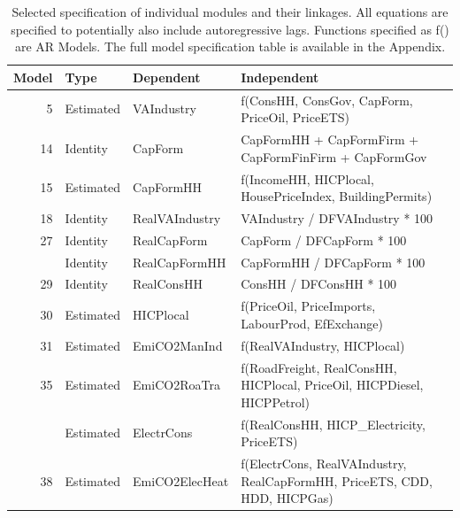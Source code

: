 \begin{table}
\centering\centering
\caption{\label{tab:spec_subset}Selected specification of individual modules and their linkages. All equations are specified to potentially also include autoregressive lags. Functions specified as f() are AR Models. The full model specification table is available in the Appendix.}
\centering
\fontsize{8}{10}\selectfont
\begin{tabular}[t]{rll>{\raggedright\arraybackslash}p{10cm}}
\toprule
Model & Type & Dependent & Independent\\
\midrule
5 & Estimated & VAIndustry & f(ConsHH, ConsGov, CapForm, PriceOil, PriceETS)\\
14 & Identity & CapForm & CapFormHH + CapFormFirm + CapFormFinFirm + CapFormGov\\
15 & Estimated & CapFormHH & f(IncomeHH, HICPlocal, HousePriceIndex, BuildingPermits)\\
18 & Identity & RealVAIndustry & VAIndustry / DFVAIndustry * 100\\
27 & Identity & RealCapForm & CapForm / DFCapForm * 100\\
\addlinespace
28 & Identity & RealCapFormHH & CapFormHH / DFCapForm * 100\\
29 & Identity & RealConsHH & ConsHH / DFConsHH * 100\\
30 & Estimated & HICPlocal & f(PriceOil, PriceImports, LabourProd, EfExchange)\\
31 & Estimated & EmiCO2ManInd & f(RealVAIndustry, HICPlocal)\\
35 & Estimated & EmiCO2RoaTra & f(RoadFreight, RealConsHH, HICPlocal, PriceOil, HICPDiesel, HICPPetrol)\\
\addlinespace
37 & Estimated & ElectrCons & f(RealConsHH, HICP\_Electricity, PriceETS)\\
38 & Estimated & EmiCO2ElecHeat & f(ElectrCons, RealVAIndustry, RealCapFormHH, PriceETS, CDD, HDD, HICPGas)\\
\bottomrule
\end{tabular}
\end{table}
